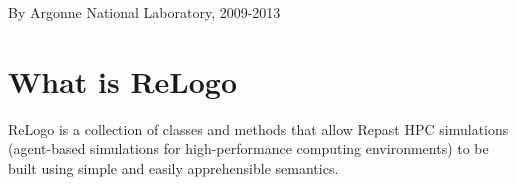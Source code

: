 By Argonne National Laboratory, 2009-\/2013\hypertarget{index_intro_sec}{}\section{What is Re\-Logo}\label{index_intro_sec}
Re\-Logo is a collection of classes and methods that allow Repast H\-P\-C simulations (agent-\/based simulations for high-\/performance computing environments) to be built using simple and easily apprehensible semantics. 